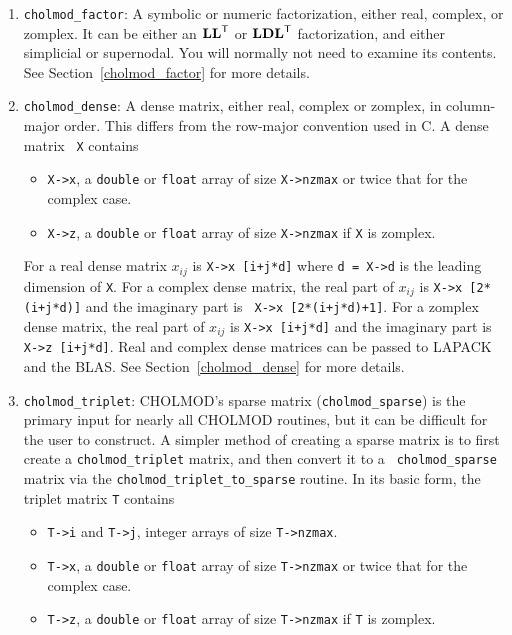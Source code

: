 \documentclass[11pt]{article}
\newcommand{\m}[1]{{\bf{#1}}}       %
\newcommand{\tr}{^{\sf T}}          %
\begin{document}
\begin{enumerate}
\item {\tt cholmod\_factor}:
    A symbolic or numeric factorization, either real, complex, or zomplex.  It
    can be either an $\m{LL}\tr$ or $\m{LDL}\tr$ factorization, and either
    simplicial or supernodal.  You will normally not need to examine its
    contents.  See Section~\ref{cholmod_factor} for more details.

\item {\tt cholmod\_dense}:
    A dense matrix, either real, complex or zomplex, in column-major order.
    This differs from the row-major convention used in C.  A dense matrix {\tt
    X} contains
    \begin{itemize}

        \item {\tt X->x}, a {\tt double} or {\tt float}
        array of size {\tt X->nzmax} or twice that for the complex case.
        \item {\tt X->z}, a {\tt double} or {\tt float}
        array of size {\tt X->nzmax} if {\tt X} is zomplex.
    \end{itemize}

    For a real dense matrix $x_{ij}$ is {\tt X->x [i+j*d]} where {\tt d = X->d}
    is the leading dimension of {\tt X}.  For a complex dense matrix, the real
    part of $x_{ij}$ is {\tt X->x [2*(i+j*d)]} and the imaginary part is {\tt
    X->x [2*(i+j*d)+1]}.  For a zomplex dense matrix, the real part of $x_{ij}$
    is {\tt X->x [i+j*d]} and the imaginary part is {\tt X->z [i+j*d]}.  Real
    and complex dense matrices can be passed to LAPACK and the BLAS.  See
    Section~\ref{cholmod_dense} for more details.

\item {\tt cholmod\_triplet}:
    CHOLMOD's sparse matrix ({\tt cholmod\_sparse}) is the primary input for
    nearly all CHOLMOD routines, but it can be difficult for the user to
    construct.  A simpler method of creating a sparse matrix is to first create
    a {\tt cholmod\_triplet} matrix, and then convert it to a {\tt
    cholmod\_sparse} matrix via the {\tt cholmod\_triplet\_to\_sparse} routine.
    In its basic form, the triplet matrix {\tt T} contains

    \begin{itemize}
        \item {\tt T->i} and {\tt T->j}, integer arrays of size {\tt T->nzmax}.
        \item {\tt T->x}, a {\tt double} or {\tt float}
        array of size {\tt T->nzmax} or twice that for the complex case.
        \item {\tt T->z}, a {\tt double} or {\tt float}
        array of size {\tt T->nzmax} if {\tt T} is zomplex.
    \end{itemize}


\end{enumerate}
\end{document}
